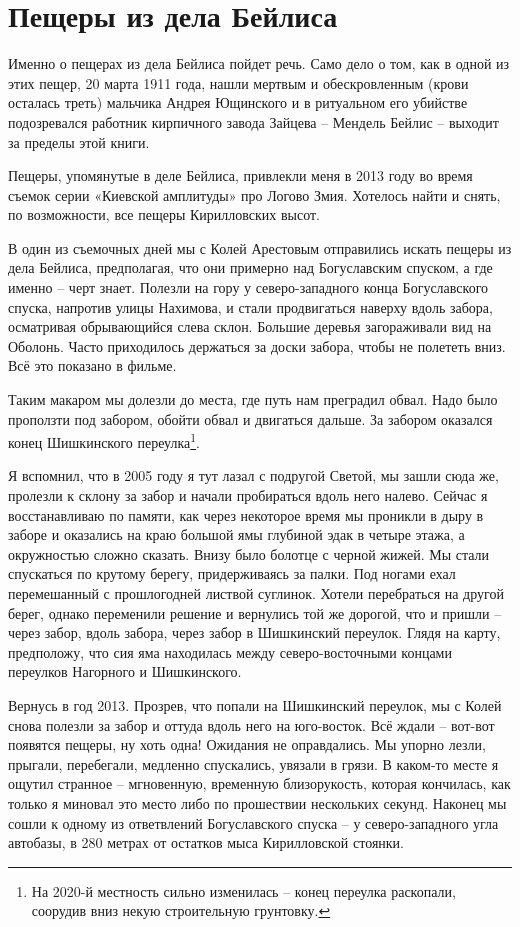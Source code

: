 \chapter{Пещеры из дела Бейлиса}

Именно о пещерах из дела Бейлиса пойдет речь. Само дело о том, как в одной из этих пещер, 20 марта 1911 года, нашли мертвым и обескровленным (крови осталась треть) мальчика Андрея Ющинского и в ритуальном его убийстве подозревался работник кирпичного завода Зайцева – Мендель Бейлис – выходит за пределы этой книги.

Пещеры, упомянутые в деле Бейлиса, привлекли меня в 2013 году во время съемок серии «Киевской амплитуды» про Логово Змия. Хотелось найти и снять, по возможности, все пещеры Кирилловских высот.

В один из съемочных дней мы с Колей Арестовым отправились искать пещеры из дела Бейлиса, предполагая, что они примерно над Богуславским спуском, а где именно – черт знает. Полезли на гору у северо-западного конца Богуславского спуска, напротив улицы Нахимова, и стали продвигаться наверху вдоль забора, осматривая обрывающийся слева склон. Большие деревья загораживали вид на Оболонь. Часто приходилось держаться за доски забора, чтобы не полететь вниз. Всё это показано в фильме.

Таким макаром мы долезли до места, где путь нам преградил обвал. Надо было проползти под забором, обойти обвал и двигаться дальше. За забором оказался конец Шишкинского переулка\footnote{На 2020-й местность сильно изменилась – конец переулка раскопали, соорудив вниз некую строительную грунтовку.}.

Я вспомнил, что в 2005 году я тут лазал с подругой Светой, мы зашли сюда же, пролезли к склону за забор и начали пробираться вдоль него налево. Сейчас я восстанавливаю по памяти, как через некоторое время мы проникли в дыру в заборе и оказались на краю большой ямы глубиной эдак в четыре этажа, а окружностью сложно сказать. Внизу было болотце с черной жижей. Мы стали спускаться по крутому берегу, придерживаясь за палки. Под ногами ехал перемешанный с прошлогодней листвой суглинок. Хотели перебраться на другой берег, однако переменили решение и вернулись той же дорогой, что и пришли – через забор, вдоль забора, через забор в Шишкинский переулок. Глядя на карту, предположу, что сия яма находилась между северо-восточными концами переулков Нагорного и Шишкинского.

Вернусь в год 2013. Прозрев, что попали на Шишкинский переулок, мы с Колей снова полезли за забор и оттуда вдоль него на юго-восток. Всё ждали – вот-вот появятся пещеры, ну хоть одна! Ожидания не оправдались. Мы упорно лезли, прыгали, перебегали, медленно спускались, увязали в грязи. В каком-то месте я ощутил странное – мгновенную, временную близорукость, которая кончилась, как только я миновал это место либо по прошествии нескольких секунд. Наконец мы сошли к одному из ответвлений Богуславского спуска – у северо-западного угла автобазы, в 280 метрах от остатков мыса Кирилловской стоянки.

